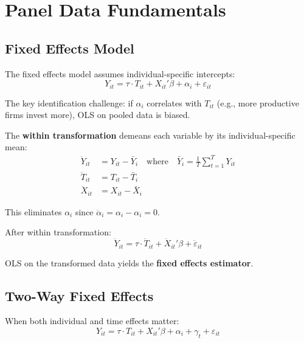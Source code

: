 \section{Panel Data Fundamentals}\label{sec:panel_fundamentals}

\subsection{Fixed Effects Model}

The fixed effects model assumes individual-specific intercepts:
\begin{equation}
Y_{it} = \tau \cdot T_{it} + X_{it}'\beta + \alpha_i + \varepsilon_{it}
\end{equation}

The key identification challenge: if $\alpha_i$ correlates with $T_{it}$ (e.g., more productive firms invest more), OLS on pooled data is biased.

\begin{definition}
\label{def:within_transform}
The \textbf{within transformation} demeans each variable by its individual-specific mean:
\begin{align}
\ddot{Y}_{it} &= Y_{it} - \bar{Y}_i \quad \text{where} \quad \bar{Y}_i = \frac{1}{T}\sum_{t=1}^{T} Y_{it} \\
\ddot{T}_{it} &= T_{it} - \bar{T}_i \\
\ddot{X}_{it} &= X_{it} - \bar{X}_i
\end{align}

This eliminates $\alpha_i$ since $\ddot{\alpha}_i = \alpha_i - \alpha_i = 0$.
\end{definition}

After within transformation:
\begin{equation}
\ddot{Y}_{it} = \tau \cdot \ddot{T}_{it} + \ddot{X}_{it}'\beta + \ddot{\varepsilon}_{it}
\end{equation}

OLS on the transformed data yields the \textbf{fixed effects estimator}.

\subsection{Two-Way Fixed Effects}

When both individual and time effects matter:
\begin{equation}
Y_{it} = \tau \cdot T_{it} + X_{it}'\beta + \alpha_i + \gamma_t + \varepsilon_{it}
\end{equation}

